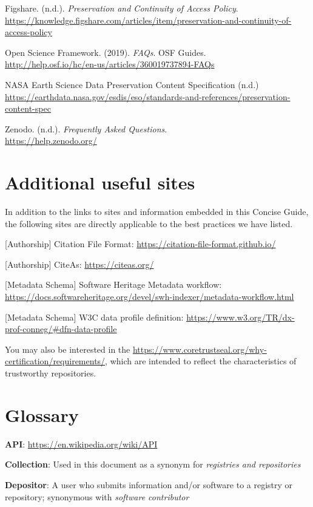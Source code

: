 \documentclass[11pt]{article}
\begin{document}
Figshare. (n.d.). \emph{Preservation and Continuity of Access Policy}.\\
\url{https://knowledge.figshare.com/articles/item/preservation-and-continuity-of-access-policy}

Open Science Framework. (2019). \emph{FAQs}. OSF Guides.\\
\url{http://help.osf.io/hc/en-us/articles/360019737894-FAQs}

NASA Earth Science Data Preservation Content Specification (n.d.)\\
\url{https://earthdata.nasa.gov/esdis/eso/standards-and-references/preservation-content-spec}

Zenodo. (n.d.). \emph{Frequently Asked Questions}.\\
\url{https://help.zenodo.org/}


\section{Additional useful sites }
\label{additional-useful-sites}

In addition to the links to sites and information embedded in this
Concise Guide, the following sites are directly applicable to the best
practices we have listed.

{[}Authorship{]} Citation File Format:
\url{https://citation-file-format.github.io/}

{[}Authorship{]} CiteAs:
\url{https://citeas.org/}

{[}Metadata Schema{]} Software Heritage Metadata workflow:
\url{https://docs.softwareheritage.org/devel/swh-indexer/metadata-workflow.html}

{[}Metadata Schema{]} W3C data profile definition:
\url{https://www.w3.org/TR/dx-prof-conneg/\#dfn-data-profile}

You may also be interested in the
\url{https://www.coretrustseal.org/why-certification/requirements/}, which are intended to
reflect the characteristics of trustworthy repositories.


\section{Glossary}
\label{glossary}

\textbf{API}: \url{https://en.wikipedia.org/wiki/API}

\textbf{Collection}: Used in this document as a synonym for
\emph{registries and repositories}

\textbf{Depositor}: A user who submits information and/or software to a
registry or repository; synonymous with \emph{software contributor}
\end{document}
